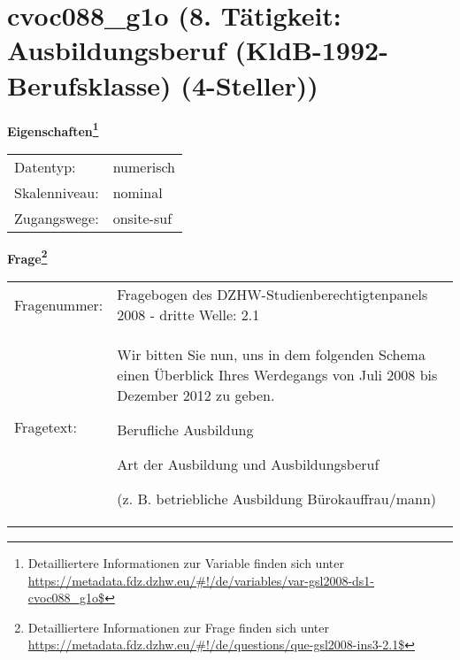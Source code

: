 
    \setcounter{footnote}{0}

    \vspace*{-1.8cm}
	\section{cvoc088\_g1o (8. Tätigkeit: Ausbildungsberuf (KldB-1992-Berufsklasse) (4-Steller))}
	\label{section:cvoc088_g1o}



    \vspace*{0.5cm}
    \noindent\textbf{Eigenschaften\footnote{Detailliertere Informationen zur Variable finden sich unter
		\url{https://metadata.fdz.dzhw.eu/\#!/de/variables/var-gsl2008-ds1-cvoc088_g1o$}}}\\
	\begin{tabularx}{\hsize}{@{}lX}
	Datentyp: & numerisch \\
	Skalenniveau: & nominal \\
	Zugangswege: &
	  onsite-suf
 \\
    \end{tabularx}



				\vspace*{0.5cm}
                \noindent\textbf{Frage\footnote{Detailliertere Informationen zur Frage finden sich unter
		              \url{https://metadata.fdz.dzhw.eu/\#!/de/questions/que-gsl2008-ins3-2.1$}}}\\
				\begin{tabularx}{\hsize}{@{}lX}
					Fragenummer: &
					  Fragebogen des DZHW-Studienberechtigtenpanels 2008 - dritte Welle:
					  2.1
 \\
					Fragetext: & Wir bitten Sie nun, uns in dem folgenden Schema einen Überblick Ihres Werdegangs von Juli 2008 bis Dezember 2012 zu geben.\par  Berufliche Ausbildung\par  Art der Ausbildung und Ausbildungsberuf\par  (z. B. betriebliche Ausbildung Bürokauffrau/mann) \\
				\end{tabularx}






